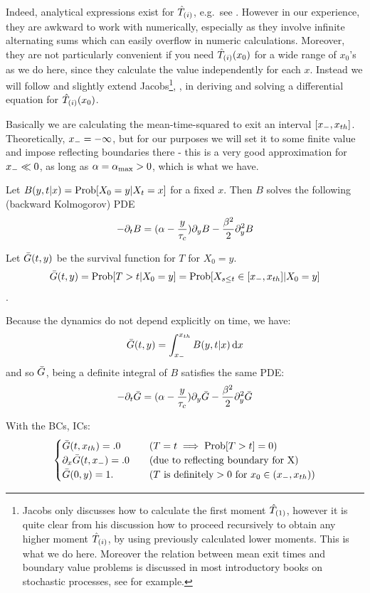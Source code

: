 \documentclass[12pt]{iopart}
\begin{document}
Indeed, analytical expressions exist for ${ \hat{T}_{(i)} }$, e.g.\ see \cite{Inoue1995}.
However in our experience, they are awkward to work with numerically, especially
as they involve infinite alternating sums which can easily overflow in numeric
calculations. Moreover, they are not particularly convenient if you need ${ \hat{T}_{(i)} }
(x_0)$ for a wide range of $x_0$'s as we do here, since they calculate the value
independently for each $x$. Instead we will follow and slightly extend Jacobs\footnote{Jacobs only discusses how to calculate the first moment
${ \hat{T}_{(1)} }$, however it is quite clear from his discussion how to proceed
recursively to obtain any higher moment ${ \hat{T}_{(i)} }$, by using previously calculated
lower moments. This is what we do here. Moreover the relation between mean exit
times and boundary value problems is discussed in most
introductory books on stochastic processes, see \cite{Oksendal2007} for
example.}, \cite{Jacobs}, in deriving and solving a differential equation for
${ \hat{T}_{(i)} }(x_0)$.

Basically we are calculating the mean-time-squared to exit an interval $[{ x_{-} },
{ x_{th} }]$. Theoretically, ${ x_{-} } = -\infty$, but for our purposes we will set it to
some finite value and impose reflecting boundaries there - this is a very good
approximation for ${ x_{-} } \ll 0$, as long as ${\alpha} = { {\alpha}_{\textrm{max}} } >0$, which is what we
have.

Let $B(y,t|x) = \operatorname{Prob}[X_0 = y| X_t = x]$ for a fixed $x$. Then $B$ solves the
following (backward Kolmogorov) PDE
\begin{equation}
-{\partial}_t B = ({\alpha} - \frac y{{ \tau_{c} }}){\partial}_yB - \frac {{\beta}^2} 2 {\partial}_y^2 B
\label{eq:backward_Xdensity}
\end{equation}

Let ${ \bar{G} }(t,y)$ be the survival function for $T$ for $X_0 = y$.
$${ \bar{G} }(t,y) = \operatorname{Prob}[T>t | X_0 = y] = \operatorname{Prob}[X_{s\leq t} \in [{ x_{-} },
{ x_{th} }] | X_0 = y]$$.

Because the dynamics do not depend explicitly on time, we have:
$$
{ \bar{G} }(t,y) = \int_{ x_{-} }^{ x_{th} } B(y,t|x) \, \mathrm{d} x
$$
and so ${ \bar{G} }$, being a definite integral of $B$ satisfies the same PDE:
\begin{equation}
-{\partial}_t { \bar{G} } = ({\alpha} - \frac y{{ \tau_{c} }}) {\partial}_y{ \bar{G} } - \frac {{\beta}^2} 2 {\partial}_y^2 { \bar{G} }
\label{eq:backward_SDF}
\end{equation}

With the BCs, ICs:
\begin{equation}
\begin{cases}
{ \bar{G} }(t,{ x_{th} }) = .0 & \quad (T = t \implies \operatorname{Prob}[T>t] = 0)
\\
{\partial}_x { \bar{G} }(t,{ x_{-} }) = .0  & \quad (\textrm{due to reflecting boundary for X})
\\
{ \bar{G} }(0, y) = 1. & \quad (T \textrm{ is definitely} > 0 \textrm{ for } x_0 \in
({ x_{-} }, { x_{th} }) )
\end{cases}
\end{equation}
\end{document}
